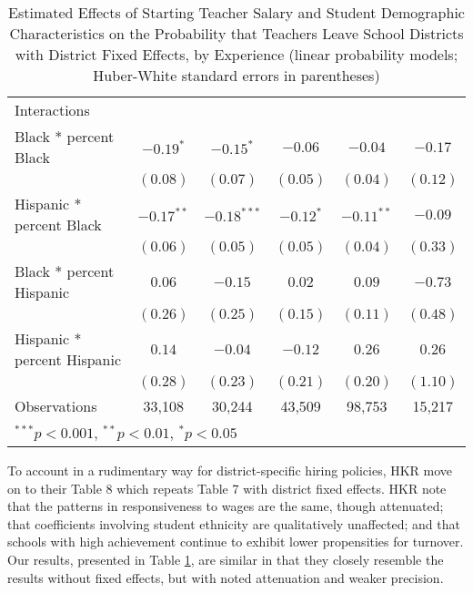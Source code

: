 \begin{table}
\begin{center}
\begin{adjustbox}{width=\textwidth,totalheight=0.85\textheight,keepaspectratio}
\begin{tabular}{l c c c c c }
Interactions                                &              &               &              &              &              \\
\quad Black * percent Black                 & $-0.19^{*}$  & $-0.15^{*}$   & $-0.06$      & $-0.04$      & $-0.17$      \\
                                            & $(0.08)$     & $(0.07)$      & $(0.05)$     & $(0.04)$     & $(0.12)$     \\
\quad Hispanic * percent Black              & $-0.17^{**}$ & $-0.18^{***}$ & $-0.12^{*}$  & $-0.11^{**}$ & $-0.09$      \\
                                            & $(0.06)$     & $(0.05)$      & $(0.05)$     & $(0.04)$     & $(0.33)$     \\
\quad Black * percent Hispanic              & $0.06$       & $-0.15$       & $0.02$       & $0.09$       & $-0.73$      \\
                                            & $(0.26)$     & $(0.25)$      & $(0.15)$     & $(0.11)$     & $(0.48)$     \\
\quad Hispanic * percent Hispanic           & $0.14$       & $-0.04$       & $-0.12$      & $0.26$       & $0.26$       \\
                                            & $(0.28)$     & $(0.23)$      & $(0.21)$     & $(0.20)$     & $(1.10)$     \\
\hline
Observations                                & 33,108        & 30,244         & 43,509        & 98,753        & 15,217        \\
\hline
\multicolumn{6}{l}{\scriptsize{$^{***}p<0.001$, $^{**}p<0.01$, $^*p<0.05$}}
\end{tabular}
\end{adjustbox}
\caption{\scriptsize{Estimated Effects of Starting Teacher Salary and Student Demographic Characteristics on the Probability that Teachers Leave School Districts with District Fixed Effects, by Experience (linear probability models; Huber-White standard errors in parentheses)}}
\label{tbl:reg_lpm_fe}
\end{center}
\end{table}

To account in a rudimentary way for district-specific hiring policies,
HKR move on to their Table 8 which repeats Table 7 with district fixed
effects. HKR note that the patterns in responsiveness to wages are the
same, though attenuated; that coefficients involving student ethnicity
are qualitatively unaffected; and that schools with high achievement
continue to exhibit lower propensities for turnover. Our results,
presented in Table \ref{tbl:reg_lpm_fe}, are similar in that they
closely resemble the results without fixed effects, but with noted
attenuation and weaker precision.

